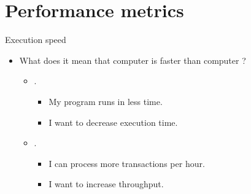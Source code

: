 \section{Performance metrics}

\begin{frame}[t]{Execution speed}
\begin{itemize}
  \item What does it mean that computer  
        is faster than computer ?

    \begin{itemize}
      \item {}.
        \begin{itemize}
          \item My program runs in less time.
          \item I want to decrease execution time.
        \end{itemize}

      \item {}.
        \begin{itemize}
          \item I can process more transactions per hour.
          \item I want to increase throughput.
        \end{itemize}
    \end{itemize}
\end{itemize}
\end{frame}

